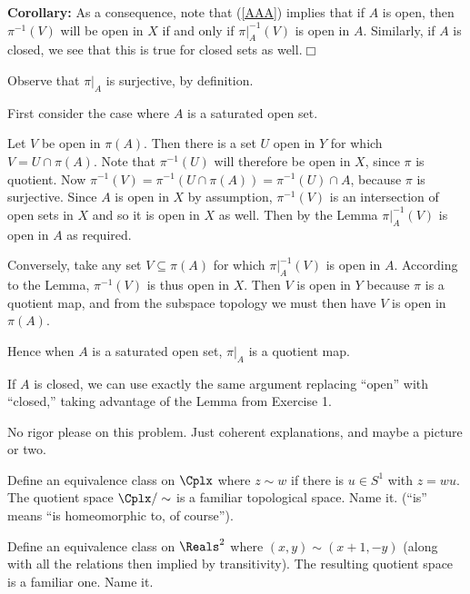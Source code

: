 \documentclass{homework651}
\newcommand\nextprob{\newpage}
\begin{document}
\begin{aproblems}
\textbf{Corollary:} As a consequence, note that (\ref{AAA}) implies that if $A$ is open,
then $\pi^{-1}(V)$ will be open in $X$ if and only if
$\pi|_A^{-1}(V)$ is open in $A$.  Similarly, if $A$ is closed, we see that this is
true for closed sets as
well.\hfill$\Box$

\solution
Observe that $\pi|_A$ is surjective, by definition.

First consider the case where $A$ is a saturated open set.

Let $V$ be open in $\pi(A)$.
Then there is a set $U$ open in $Y$ for which $V=U\cap\pi(A)$.
Note that $\pi^{-1}(U)$ will therefore be open in $X$, since $\pi$ is quotient.
Now $\pi^{-1}(V)=\pi^{-1}(U\cap\pi(A))=\pi^{-1}(U)\cap A$, because
$\pi$ is surjective.  Since $A$ is
open in $X$ by assumption, $\pi^{-1}(V)$ is an intersection of open sets in $X$ and
so it is open in $X$ as well.
Then by the Lemma $\pi|_A^{-1}(V)$ is open
in $A$ as required.

Conversely, take any set $V\subseteq\pi(A)$ for which $\pi|_A^{-1}(V)$ is open in $A$.
According to the Lemma, $\pi^{-1}(V)$ is thus open in $X$.
Then $V$ is open in $Y$ because $\pi$ is a quotient map, and from
the subspace topology we must then have $V$ is open in $\pi(A)$.

Hence when $A$ is a saturated open set, $\pi|_A$ is a quotient map.

If
$A$ is closed, we can use exactly the same argument replacing ``open''
with ``closed,'' taking advantage of the Lemma from Exercise 1.

\nextprob
\hproblem No rigor please on this problem.  Just coherent explanations, and maybe
a picture or two.
\begin{subproblems}
\item Define an equivalence class on $\Cplx$ where $z\sim w$ if there is $u\in S^1$ with
$z=wu$.  The quotient space $\Cplx/\sim$ is a familiar topological space.  Name it.
 (``is'' means ``is homeomorphic to, of course'').
\item Define an equivalence class on $\Reals^2$ where $(x,y)\sim (x+1,-y)$ (along with all the relations then implied by transitivity).  The resulting quotient space is a familiar one.  Name it.
\end{subproblems}
\subsol

\begin{wrapfigure}{R}{2in}
\end{wrapfigure}


\end{aproblems}
\end{document}
